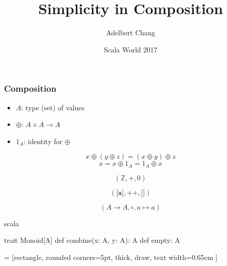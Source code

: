 \documentclass{beamer}
\title{Simplicity in Composition}
\author{Adelbert Chang}
\date{Scala World 2017}
\def\code#1{\texttt{#1}}
\newcommand{\gpause}{\vspace*{-\baselineskip}\pause}
\begin{document}
\frame{\titlepage}

\begin{frame}

  \frametitle{Composition}
  \large

  \begin{itemize}
    \item $A$: type (set) of values \pause
    \item $\oplus$: $A \times A \rightarrow A$ \pause
    \item $1_{A}$: identity for $\oplus$ \pause
  \end{itemize}

  $$x \oplus (y \oplus z) = (x \oplus y) \oplus z$$ \gpause
  $$x = x \oplus 1_{A} = 1_{A} \oplus x$$

\end{frame}

\begin{frame} \Large $$(\mathbb{Z}, +, 0)$$ \end{frame}

\begin{frame} \Large $$(\code{[a]}, +\!\!+, \code{[]})$$ \end{frame}

\begin{frame} \Large $$(A \rightarrow A, \circ, a \mapsto a)$$ \end{frame}

\begin{frame}[fragile]
  \large
  \centering

  \begin{cminted}{scala}

 trait Monoid[A] {
   def combine(x: A, y: A): A
   def empty: A
 }

  \end{cminted}

\end{frame}

 = [rectangle, rounded corners=5pt, thick, draw, text width=0.65cm ]


\begin{frame}
  \centering


\end{frame}
\end{document}
